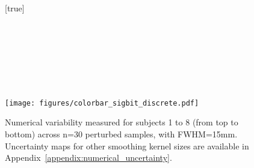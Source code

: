 \documentclass[lettersize,journal]{IEEEtran}
\begin{document}

\begin{figure}
    \centering
    [true] \\
     \\
     \\
     \\
     \\
     \\
     \\
     \\
    \texttt{[image: figures/colorbar\_sigbit\_discrete.pdf]}
    \caption{Numerical variability measured for subjects 1 to 8 (from top to bottom) across n=30 perturbed samples, with FWHM=15mm. Uncertainty maps for other smoothing kernel sizes are available in Appendix~\ref{appendix:numerical_uncertainty}.}
    \label{fig:uncertainty-maps}
\end{figure}
\end{document}
